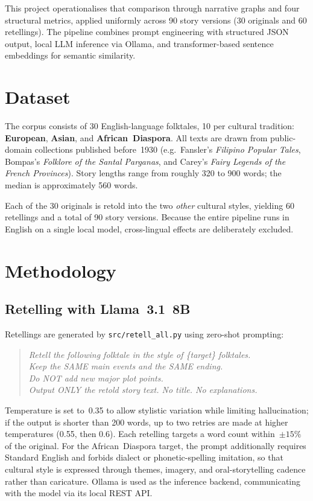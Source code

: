 \documentclass[11pt,a4paper]{article}
\begin{document}
This project operationalises that comparison through narrative graphs and four
structural metrics, applied uniformly across 90 story versions (30 originals and
60 retellings).  The pipeline combines prompt engineering with structured JSON
output, local LLM inference via Ollama, and transformer-based sentence
embeddings for semantic similarity.

\section{Dataset}

The corpus consists of 30 English-language folktales, 10 per cultural tradition:
\textbf{European}, \textbf{Asian}, and \textbf{African~Diaspora}.  All texts are
drawn from public-domain collections published before~1930 (e.g.\ Fansler's
\textit{Filipino Popular Tales}, Bompas's \textit{Folklore of the Santal
Parganas}, and Carey's \textit{Fairy Legends of the French Provinces}).
Story lengths range from roughly 320 to 900 words; the median is approximately
560 words.

Each of the 30 originals is retold into the two \emph{other} cultural styles,
yielding 60 retellings and a total of 90 story versions.  Because the entire
pipeline runs in English on a single local model, cross-lingual effects are
deliberately excluded.

\section{Methodology}

\subsection{Retelling with Llama~3.1~8B}

Retellings are generated by \texttt{src/retell\_all.py} using zero-shot prompting:
\begin{quote}
\textit{Retell the following folktale in the style of \{target\} folktales.\\
Keep the SAME main events and the SAME ending.\\
Do NOT add new major plot points.\\
Output ONLY the retold story text.  No title.  No explanations.}
\end{quote}
Temperature is set to~0.35 to allow stylistic variation while limiting
hallucination; if the output is shorter than 200 words, up to two retries are
made at higher temperatures (0.55, then 0.6).  Each retelling targets a word
count within~$\pm15\%$ of the original.  For the African~Diaspora target, the
prompt additionally requires Standard English and forbids dialect or
phonetic-spelling imitation, so that cultural style is expressed through themes,
imagery, and oral-storytelling cadence rather than caricature.  Ollama is used
as the inference backend, communicating with the model via its local REST API.
\end{document}

